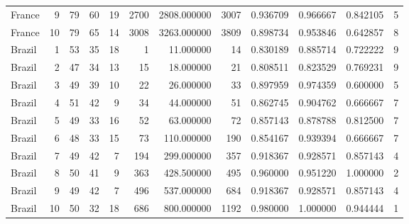 \begin{tabular}{lrrrrrrrrrrr}
France & 9 & 79 & 60 & 19 & 2700 & 2808.000000 & 3007 & 0.936709 & 0.966667 & 0.842105 & 5 \\
France & 10 & 79 & 65 & 14 & 3008 & 3263.000000 & 3809 & 0.898734 & 0.953846 & 0.642857 & 8 \\
Brazil & 1 & 53 & 35 & 18 & 1 & 11.000000 & 14 & 0.830189 & 0.885714 & 0.722222 & 9 \\
Brazil & 2 & 47 & 34 & 13 & 15 & 18.000000 & 21 & 0.808511 & 0.823529 & 0.769231 & 9 \\
Brazil & 3 & 49 & 39 & 10 & 22 & 26.000000 & 33 & 0.897959 & 0.974359 & 0.600000 & 5 \\
Brazil & 4 & 51 & 42 & 9 & 34 & 44.000000 & 51 & 0.862745 & 0.904762 & 0.666667 & 7 \\
Brazil & 5 & 49 & 33 & 16 & 52 & 63.000000 & 72 & 0.857143 & 0.878788 & 0.812500 & 7 \\
Brazil & 6 & 48 & 33 & 15 & 73 & 110.000000 & 190 & 0.854167 & 0.939394 & 0.666667 & 7 \\
Brazil & 7 & 49 & 42 & 7 & 194 & 299.000000 & 357 & 0.918367 & 0.928571 & 0.857143 & 4 \\
Brazil & 8 & 50 & 41 & 9 & 363 & 428.500000 & 495 & 0.960000 & 0.951220 & 1.000000 & 2 \\
Brazil & 9 & 49 & 42 & 7 & 496 & 537.000000 & 684 & 0.918367 & 0.928571 & 0.857143 & 4 \\
Brazil & 10 & 50 & 32 & 18 & 686 & 800.000000 & 1192 & 0.980000 & 1.000000 & 0.944444 & 1 \\
\bottomrule
\end{tabular}
